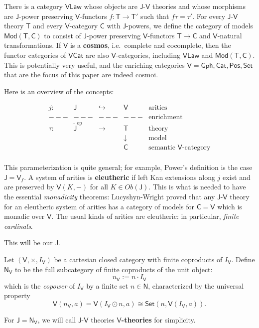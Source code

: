 \documentclass{amsart}
\theoremstyle{definition}
\newcommand{\Gph}{\mathsf{Gph}}
\newcommand{\Set}{\mathsf{Set}}
\newcommand{\Cat}{\mathsf{Cat}}
\newcommand{\Law}{\mathsf{Law}}
\newcommand{\Pos}{\mathsf{Pos}}
\newcommand{\Mod}{\mathsf{Mod}}
\newcommand{\NN}{\mathsf{N}}
\newcommand{\V}{\mathsf{V}}
\newcommand{\C}{\mathsf{C}}
\newcommand{\J}{\mathsf{J}}
\newcommand{\T}{\mathsf{T}}
\newcommand{\op}{\mathrm{op}}
\newcommand{\maps}{\colon}
\begin{document}
There is a category $\V\Law$ whose objects are $\J$-$\V$ theories and whose morphisms are $\J$-power preserving $\V$-functors $f\maps \T \to \T'$ such that $f\tau = \tau'$. For every $\J$-$\V$ theory $\T$ and every $\V$-category $\C$ with $\J$-powers, we define the category of models $\Mod(\T,\C)$ to consist of $\J$-power preserving $\V$-functors $\T\to \C$ and $\V$-natural transformations. If  $\V$ is a \textbf{cosmos}, i.e.\ complete and cocomplete, then the functor categories of $\V\Cat$ are also $\V$-categories, including $\V\Law$ and $\Mod(\T,\C)$. This is potentially very useful, and the enriching categories $\V = \Gph, \Cat, \Pos, \Set$ that are the focus of this paper are indeed cosmoi.

Here is an overview of the concepts: 

\[\begin{array}{ccccl}
j\maps & \J & \hookrightarrow & \V & \text{arities}\\
---& --- & --- & --- & \text{enrichment}\\
\tau\maps & \tilde{\J}^\op & \to & \T & \text{theory}\\
& & & \downarrow & \text{model}\\
& & & \C & \text{semantic $\V$-category}\\
\end{array}\]

This parameterization is quite general; for example, Power's definition is the case $\J = \V_f$. A system of arities is \textbf{eleutheric} if left Kan extensions along $j$ exist and are preserved by $\V(K,-)$ for all $K \in Ob(\J)$. This is what is needed to have the essential \textit{monadicity} theorems: Lucyshyn-Wright proved that any $\J$-$\V$ theory for an eleutheric system of arities has a category of models for $\C = \V$ which is monadic over $\V$. The usual kinds of arities are eleutheric: in particular, \textit{finite cardinals}.

This will be our $\J$.

Let $(\V,\times,I_\V)$ be a cartesian closed category with finite coproducts of $I_\V$. Define $\NN_\V$ to be the full subcategory of finite coproducts of the unit object: $$n_\V := n \cdot I_\V$$ which is the \textit{copower} of $I_\V$ by a finite set $n \in \NN$, characterized by the universal property
\begin{equation}
\V(n_\V,a) = \V(I_\V \odot n,a) \cong \Set(n,\V(I_\V,a)).
\end{equation}

For $\J = \NN_\V$, we will call $\J$-$\V$ theories \textbf{$\V$-theories} for simplicity.
\end{document}
